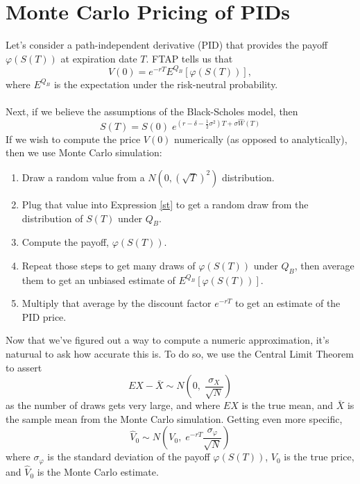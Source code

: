 \documentclass[12pt]{article}
\theoremstyle{plain}
\theoremstyle{definition}
\theoremstyle{remark}
\begin{document}
\newpage

\section{Monte Carlo Pricing of PIDs}

Let's consider a path-independent derivative (PID) that provides the
payoff $\varphi(S(T))$ at expiration date $T$. FTAP tells us that
\begin{equation}
   \label{vee}
   V(0) = e^{-r T} E^{Q_B}\left[\varphi(S(T))\right],
\end{equation}
where $E^{Q_B}$ is the expectation under the risk-neutral probability.
\\
\\
Next, if we believe the assumptions of the Black-Scholes model, then
\begin{equation}
   \label{st}
   S(T)=S(0)\; e^{\left(r - \delta - \frac{1}{2}\sigma^2\right) T +
      \sigma \hat{W}(T)} 
\end{equation}
If we wish to compute the price $V(0)$ numerically (as opposed to 
analytically), then we use Monte Carlo simulation:
\begin{enumerate}
   \item{Draw a random value from a 
	 $N(0, (\sqrt{T})^2)$ 
      distribution.}
   \item{Plug that value into Expression \ref{st} to get a random
      draw from the distribution of $S(T)$ under $Q_B$.}
   \item{Compute the payoff, $\varphi(S(T))$.}
   \item{Repeat those steps to get many draws of $\varphi(S(T))$ under 
	 $Q_B$, then average them to get an unbiased estimate of 
	 $E^{Q_B}\left[\varphi(S(T))\right]$.}
   \item{Multiply that average by the discount factor $e^{-rT}$ to
      get an estimate of the PID price.}
\end{enumerate}
Now that we've figured out a way to compute a numeric approximation, 
it's naturual to ask how accurate this is.  To do so, we use the
Central Limit Theorem to assert
\[ EX - \bar{X} \sim N\left(0,\; \frac{\sigma_X}{\sqrt{N}}\right) \] 
as the number of draws gets very large, and where $EX$ is the true
mean, and $\bar{X}$ is the sample mean from the Monte Carlo simulation.
Getting even more specific,
   \[ \hat{V}_0 \sim N\left(V_0, \; e^{-r T} 
      \frac{\sigma_\varphi}{\sqrt{N}}\right) \]
where $\sigma_\varphi$ is the standard deviation of the payoff 
$\varphi(S(T))$, $V_0$ is the true price, and $\hat{V}_0$ is the Monte
Carlo estimate.
   
\end{document}
